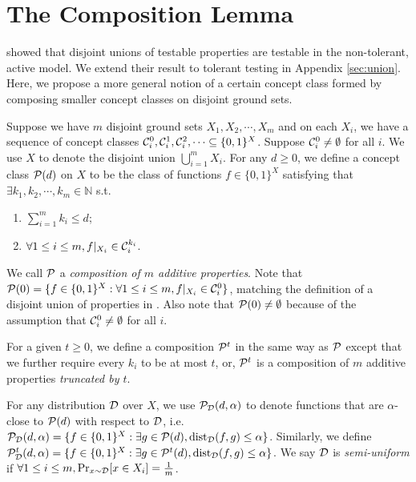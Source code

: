 \section{The Composition Lemma}
\label{sec:composition}
\citet{BBBY12} showed that disjoint unions of testable properties are testable in the non-tolerant, active model. We extend their result to tolerant testing in Appendix \ref{sec:union}. Here, we propose a more general notion of a certain concept class formed by composing smaller concept classes on disjoint ground sets.

Suppose we have $m$ disjoint ground sets $X_1,X_2,\cdots,X_m$ and on each $X_i$, we have a sequence of concept classes ${\mathcal{C}}_i^0, {\mathcal{C}}_i^1, {\mathcal{C}}_i^2, \cdots\subseteq\{0,1\}^X$. Suppose ${\mathcal{C}}_i^0\neq\emptyset$ for all $i$. We use $X$ to denote the disjoint union $\bigcup\limits_{i=1}^m X_i$. For any $d\geq 0$, we define a concept class ${\mathcal{P}}(d)$ on $X$ to be the class of functions $f\in\{0,1\}^X$ satisfying that $\exists k_1,k_2,\cdots,k_m\in\mathbb{N}$ s.t.
\begin{enumerate}
\item $\sum\limits_{i=1}^mk_i\leq d$;
\item $\forall 1\leq i\leq m, f|_{X_i}\in{\mathcal{C}}_i^{k_i}$.
\end{enumerate}

We call ${\mathcal{P}}$ a \emph{composition of $m$ additive properties}. Note that ${\mathcal{P}}(0)=\{f\in\{0,1\}^X:\forall 1\leq i\leq m,f|_{X_i}\in{\mathcal{C}}_i^0\}$, matching the definition of a disjoint union of properties in \citep{BBBY12}. Also note that ${\mathcal{P}}(0)\neq \emptyset$ because of the assumption that ${\mathcal{C}}_i^0\neq \emptyset$ for all $i$. 

For a given $t\geq 0$, we define a composition ${\mathcal{P}}^t$ in the same way as ${\mathcal{P}}$ except that we further require every $k_i$ to be at most $t$, or, ${\mathcal{P}}^t$ is a composition of $m$ additive properties \emph{truncated by $t$}. %

For any distribution ${\mathcal{D}}$ over $X$, we use ${\mathcal{P}}_{{\mathcal{D}}}(d,\alpha)$ to denote functions that are $\alpha$-close to ${\mathcal{P}}(d)$ with respect to ${\mathcal{D}}$, i.e. ${\mathcal{P}}_{{\mathcal{D}}}(d,\alpha)=\{f\in\{0,1\}^X:\exists g\in{\mathcal{P}}(d),{\mathrm{dist}}_{{\mathcal{D}}}(f,g)\leq\alpha\}$. Similarly, we define ${\mathcal{P}}^t_{{\mathcal{D}}}(d,\alpha)=\{f\in\{0,1\}^X:\exists g\in{\mathcal{P}}^t(d),{\mathrm{dist}}_{{\mathcal{D}}}(f,g)\leq\alpha\}$. We say ${\mathcal{D}}$ is \emph{semi-uniform} if $\forall 1\leq i\leq m,\Pr_{x\sim {\mathcal{D}}}[x\in X_i]=\frac{1}{m}$.


